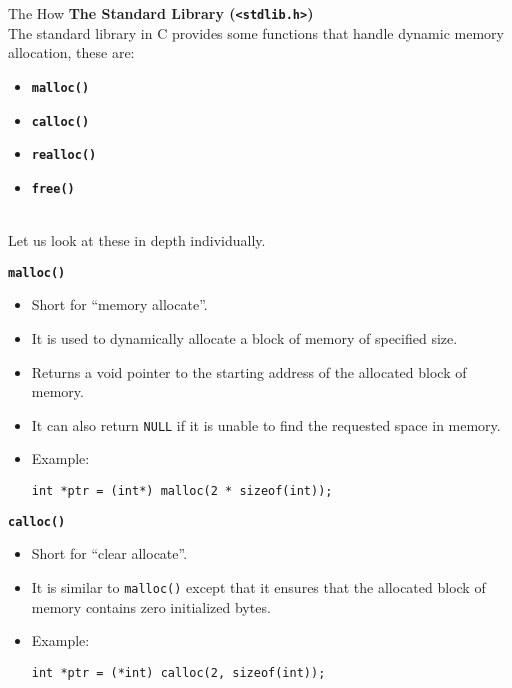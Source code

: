 \documentclass[11pt]{beamer}
\begin{document}
    \begin{frame}{The How}
        \textbf{The Standard Library (\texttt{<stdlib.h>})}\\[10pt]

        The standard library in C provides some functions that handle dynamic memory allocation, these are:\\[5pt]
        \begin{itemize}
            \item \textbf{\texttt{malloc()}}
            \item \textbf{\texttt{calloc()}}
            \item \textbf{\texttt{realloc()}}
            \item \textbf{\texttt{free()}}
        \end{itemize}
        \\[10pt]
        Let us look at these in depth individually.

        \framebreak

        \textbf{\texttt{\large malloc()}}\\[10pt]

        \begin{itemize}
            \item Short for ``memory allocate''.
            \item It is used to dynamically allocate a block of memory of specified size.
            \item Returns a void pointer to the starting address of the allocated block of memory.
            \item It can also return \texttt{NULL} if it is unable to find the requested space in memory.
            \item Example:
            \begin{tcolorbox}
                \begin{verbatim}
int *ptr = (int*) malloc(2 * sizeof(int));
                \end{verbatim}
            \end{tcolorbox}
        \end{itemize}


        \framebreak

        \textbf{\texttt{\large calloc()}}\\[10pt]

        \begin{itemize}
            \item Short for ``clear allocate''.
            \item It is similar to \texttt{malloc()} except that it ensures that the allocated block of memory
            contains zero initialized bytes.
            \item Example:
            \begin{tcolorbox}
                \begin{verbatim}
int *ptr = (*int) calloc(2, sizeof(int));
                \end{verbatim}
            \end{tcolorbox}
        \end{itemize}


\end{frame}
\end{document}

